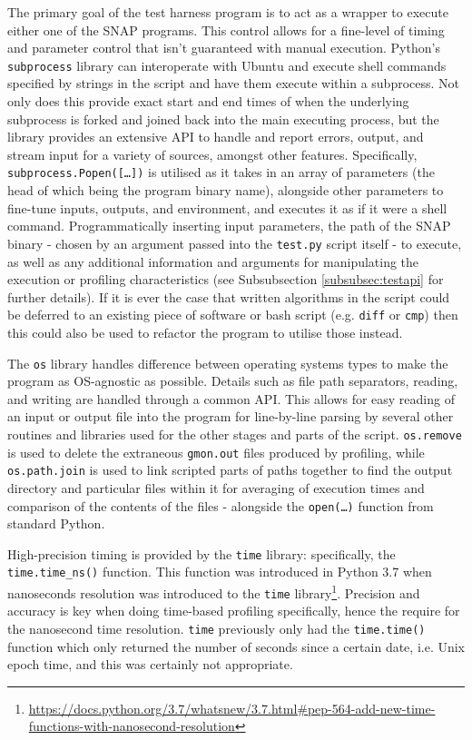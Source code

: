 \documentclass[conference]{IEEEtran}
\begin{document}
The primary goal of the test harness program is to act as a wrapper to execute either one of the SNAP programs. This control allows for a fine-level of timing and parameter control that isn't guaranteed with manual execution. Python's \texttt{subprocess} library can interoperate with Ubuntu and execute shell commands specified by strings in the script and have them execute within a subprocess. Not only does this provide exact start and end times of when the underlying subprocess is forked and joined back into the main executing process, but the library provides an extensive API to handle and report errors, output, and stream input for a variety of sources, amongst other features. Specifically, \texttt{subprocess.Popen([\dots])} is utilised as it takes in an array of parameters (the head of which being the program binary name), alongside other parameters to fine-tune inputs, outputs, and environment, and executes it as if it were a shell command. Programmatically inserting input parameters, the path of the SNAP binary - chosen by an argument passed into the \texttt{test.py} script itself - to execute, as well as any additional information and arguments for manipulating the execution or profiling characteristics (see Subsubsection \ref{subsubsec:testapi} for further details). If it is ever the case that written algorithms in the script could be deferred to an existing piece of software or bash script (e.g. \texttt{diff} or \texttt{cmp}) then this could also be used to refactor the program to utilise those instead.

The \texttt{os} library handles difference between operating systems types to make the program as OS-agnostic as possible. Details such as file path separators, reading, and writing are handled through a common API. This allows for easy reading of an input or output file into the program for line-by-line parsing by several other routines and libraries used for the other stages and parts of the script. \texttt{os.remove} is used to delete the extraneous \texttt{gmon.out} files produced by profiling, while \texttt{os.path.join} is used to link scripted parts of paths together to find the output directory and particular files within it for averaging of execution times and comparison of the contents of the files - alongside the \texttt{open(\dots)} function from standard Python.

High-precision timing is provided by the \texttt{time} library: specifically, the \texttt{time.time\_ns()} function. This function was introduced in Python 3.7 when nanoseconds resolution was introduced to the \texttt{time} library\footnote{\url{https://docs.python.org/3.7/whatsnew/3.7.html#pep-564-add-new-time-functions-with-nanosecond-resolution}\RaggedRight}. Precision and accuracy is key when doing time-based profiling specifically, hence the require for the nanosecond time resolution. \texttt{time} previously only had the \texttt{time.time()} function which only returned the number of seconds since a certain date, i.e. Unix epoch time, and this was certainly not appropriate. 
\end{document}
